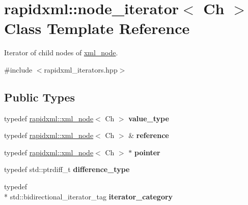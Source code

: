 \hypertarget{classrapidxml_1_1node__iterator}{\section{rapidxml\-:\-:node\-\_\-iterator$<$ Ch $>$ Class Template Reference}
\label{classrapidxml_1_1node__iterator}
}


Iterator of child nodes of \hyperlink{classrapidxml_1_1xml__node}{xml\-\_\-node}.  




{\ttfamily \#include $<$rapidxml\-\_\-iterators.\-hpp$>$}

\subsection*{Public Types}
\begin{DoxyCompactItemize}
\item 
\hypertarget{classrapidxml_1_1node__iterator_abac03542109038f6530570c0e35fdb33}{typedef \hyperlink{classrapidxml_1_1xml__node}{rapidxml\-::xml\-\_\-node}$<$ Ch $>$ {\bfseries value\-\_\-type}}\label{classrapidxml_1_1node__iterator_abac03542109038f6530570c0e35fdb33}

\item 
\hypertarget{classrapidxml_1_1node__iterator_a319b8d97412921be764579b4ccc0f7fd}{typedef \hyperlink{classrapidxml_1_1xml__node}{rapidxml\-::xml\-\_\-node}$<$ Ch $>$ \& {\bfseries reference}}\label{classrapidxml_1_1node__iterator_a319b8d97412921be764579b4ccc0f7fd}

\item 
\hypertarget{classrapidxml_1_1node__iterator_a53eab7bfecf42f9c2e96b4c5e0071e64}{typedef \hyperlink{classrapidxml_1_1xml__node}{rapidxml\-::xml\-\_\-node}$<$ Ch $>$ $\ast$ {\bfseries pointer}}\label{classrapidxml_1_1node__iterator_a53eab7bfecf42f9c2e96b4c5e0071e64}

\item 
\hypertarget{classrapidxml_1_1node__iterator_a5bdc462b980a52c5fa2d99ac9f4f4bff}{typedef std\-::ptrdiff\-\_\-t {\bfseries difference\-\_\-type}}\label{classrapidxml_1_1node__iterator_a5bdc462b980a52c5fa2d99ac9f4f4bff}

\item 
\hypertarget{classrapidxml_1_1node__iterator_a8e82d75f768e17bf7349d010ee26c037}{typedef \\*
std\-::bidirectional\-\_\-iterator\-\_\-tag {\bfseries iterator\-\_\-category}}\label{classrapidxml_1_1node__iterator_a8e82d75f768e17bf7349d010ee26c037}

\end{DoxyCompactItemize}
